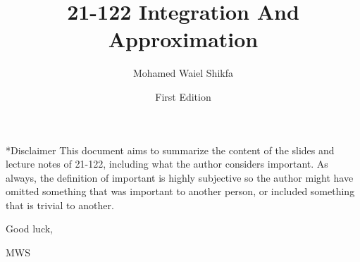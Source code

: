 \documentclass[notitlepage]{report}
\title{\textcolor{chaptergreen}{21-122 Integration And Approximation}}
\date{First Edition}
\author{Mohamed Waiel Shikfa}
\makeatletter
\def\chapter{\@ifstar\@schapter\@chapter}
\def\@chapter#1{%
  \refstepcounter{chapter}%
  \addcontentsline{toc}{chapter}{\protect\numberline{\thechapter}#1}%
  \chaptermark{#1}%
  {\par\vspace{2em}\centering\LARGE\bfseries
   \textcolor{chaptergreen}{Chapter \thechapter\\#1}\par\vspace{1em}}%
}
\def\@schapter#1{%
  {\par\vspace{1em}\centering\LARGE\bfseries
   \textcolor{chaptergreen}{#1}\par\vspace{1em}}%
}
\makeatother
\begin{document}
\maketitle

\chapter*{Disclaimer}
This document aims to summarize the content of the slides and lecture notes of 21-122, including
what the author considers important. As always, the definition of important is
highly subjective so the author might have omitted something that was
important to another person, or included something that is trivial to another.

Good luck,

MWS

\tableofcontents
\clearpage


\clearpage

\clearpage

\clearpage

\clearpage

\clearpage

\clearpage

\clearpage

\clearpage
\end{document}
